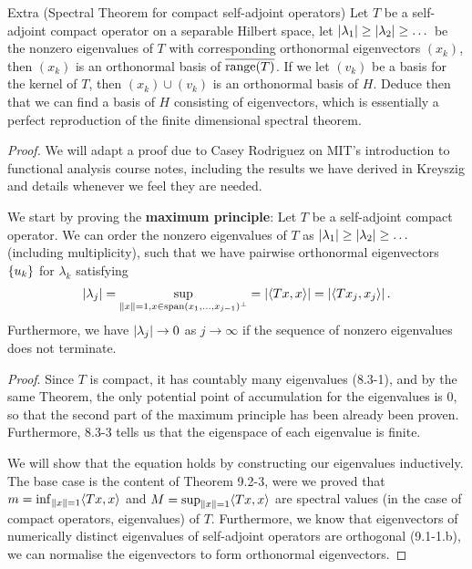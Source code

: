 \begin{exercise}{Extra (Spectral Theorem for compact self-adjoint operators)}
Let $T$ be a self-adjoint compact operator on a separable Hilbert space, let $\left\lvert \lambda_1\right\rvert \geq \left\lvert \lambda_2\right\rvert \geq \dots$ be the nonzero eigenvalues of $T$ with corresponding orthonormal eigenvectors $(x_k)$, then $(x_k)$ is an orthonormal basis of $\overline{\operatorname*{range}(T)}$. 
If we let $(v_k)$ be a basis for the kernel of $T$, then $(x_k) \cup (v_k)$ is an orthonormal basis of $H$. 
Deduce then that we can find a basis of $H$ consisting of eigenvectors, which is essentially a perfect reproduction of the finite dimensional spectral theorem.
\end{exercise}
\begin{proof}
We will adapt a proof due to Casey Rodriguez on MIT's introduction to functional analysis course notes, including the results we have derived in Kreyszig and details whenever we feel they are needed.

We start by proving the \textbf{maximum principle}:
Let $T$ be a self-adjoint compact operator.
We can order the nonzero eigenvalues of $T$ as $\left\lvert \lambda_1\right\rvert \geq \left\lvert \lambda_2\right\rvert \geq \dots$ (including multiplicity), such that we have pairwise orthonormal eigenvectors $\{u_k\}$ for $\lambda_k$ satisfying 
\begin{align*}
    \left\lvert \lambda_j\right\rvert 
    = \sup_{\left\lVert x\right\rVert =1, x \in \operatorname*{span}(x_1, \dots, x_{j-1})^\perp} 
    = \left\lvert \langle Tx, x\rangle\right\rvert = \left\lvert \langle T x_j, x_j\rangle\right\rvert.
\end{align*}
Furthermore, we have $\left\lvert \lambda_j\right\rvert \to 0$ as $j \to \infty$ if the sequence of nonzero eigenvalues does not terminate.

\textit{Proof}.
Since $T$ is compact, it has countably many eigenvalues (8.3-1), and by the same Theorem, the only potential point of accumulation for the eigenvalues is 0, so that the second part of the maximum principle has been already been proven. 
Furthermore, 8.3-3 tells us that the eigenspace of each eigenvalue is finite.

We will show that the equation holds by constructing our eigenvalues inductively.
The base case is the content of Theorem 9.2-3, were we proved that $m = \inf_{\left\lVert x\right\rVert=1} \langle Tx, x\rangle$ and $M = \sup_{\left\lVert x\right\rVert=1} \langle Tx, x\rangle$ are spectral values (in the case of compact operators, eigenvalues) of $T$.
Furthermore, we know that eigenvectors of numerically distinct eigenvalues of self-adjoint operators are orthogonal (9.1-1.b), we can normalise the eigenvectors to form orthonormal eigenvectors.


\end{proof}
